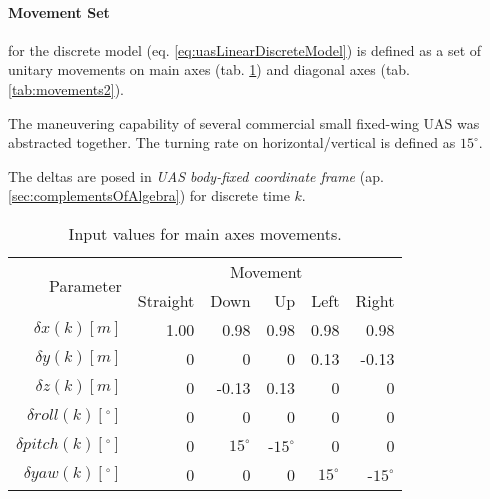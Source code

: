 \paragraph{Movement Set} for the discrete model (eq. \ref{eq:uasLinearDiscreteModel}) is defined as a set of unitary movements on main axes (tab. \ref{tab:movements1}) and diagonal axes (tab. \ref{tab:movements2}). 

The maneuvering capability of several commercial small fixed-wing UAS was abstracted together. The turning rate on horizontal/vertical is defined as $15^\circ$.

The deltas are posed in \emph{UAS body-fixed coordinate frame} (ap. \ref{sec:complementsOfAlgebra}) for discrete time $k$. 

\begin{table}[H]
    \centering
    \begin{tabular}{r||r|r|r|r|r}
    	\multirow{2}{*}{Parameter} & \multicolumn{5}{c}{Movement} \\\cline{2-6} 
                &    Straight  & Down & Up & Left  & Right   \\\hline\hline
        $\delta     x(k)[m]$           &    1.00	  & 0.98  & 0.98  & 0.98 & 0.98  \\\hline
        $\delta     y(k)[m]$           &    0	      & 0	  & 0	  & 0.13 & -0.13 \\\hline
        $\delta     z(k)[m]$           &    0	      & -0.13 & 0.13  &	0	 & 0     \\\hline
        $\delta  roll(k) [^\circ]$	   &    0	      & 0	  & 0	  & 0    & 0     \\\hline
        $\delta pitch(k) [^\circ]$     &    0	      & $15^\circ$  & -$15^\circ$ & 0	 & 0     \\\hline
        $\delta   yaw(k) [^\circ]$     &    0	      & 0	  & 0	  & $15^\circ$ & -$15^\circ$ \\
    \end{tabular}
    \caption{Input values for main axes movements.}
    \label{tab:movements1}
\end{table}
